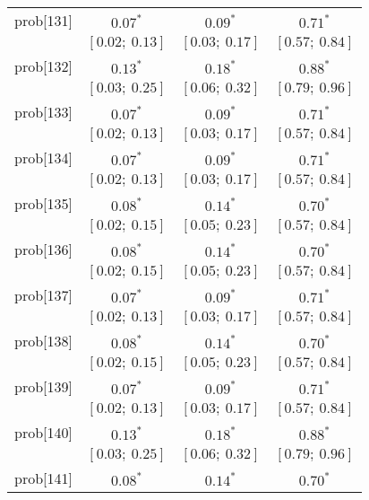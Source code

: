 \begin{table}
\begin{center}
\begin{tabular}{l c c c }
prob[131] & $0.07^{*}$              & $0.09^{*}$              & $0.71^{*}$            \\
          & $[0.02;\ 0.13]$         & $[0.03;\ 0.17]$         & $[0.57;\ 0.84]$       \\
prob[132] & $0.13^{*}$              & $0.18^{*}$              & $0.88^{*}$            \\
          & $[0.03;\ 0.25]$         & $[0.06;\ 0.32]$         & $[0.79;\ 0.96]$       \\
prob[133] & $0.07^{*}$              & $0.09^{*}$              & $0.71^{*}$            \\
          & $[0.02;\ 0.13]$         & $[0.03;\ 0.17]$         & $[0.57;\ 0.84]$       \\
prob[134] & $0.07^{*}$              & $0.09^{*}$              & $0.71^{*}$            \\
          & $[0.02;\ 0.13]$         & $[0.03;\ 0.17]$         & $[0.57;\ 0.84]$       \\
prob[135] & $0.08^{*}$              & $0.14^{*}$              & $0.70^{*}$            \\
          & $[0.02;\ 0.15]$         & $[0.05;\ 0.23]$         & $[0.57;\ 0.84]$       \\
prob[136] & $0.08^{*}$              & $0.14^{*}$              & $0.70^{*}$            \\
          & $[0.02;\ 0.15]$         & $[0.05;\ 0.23]$         & $[0.57;\ 0.84]$       \\
prob[137] & $0.07^{*}$              & $0.09^{*}$              & $0.71^{*}$            \\
          & $[0.02;\ 0.13]$         & $[0.03;\ 0.17]$         & $[0.57;\ 0.84]$       \\
prob[138] & $0.08^{*}$              & $0.14^{*}$              & $0.70^{*}$            \\
          & $[0.02;\ 0.15]$         & $[0.05;\ 0.23]$         & $[0.57;\ 0.84]$       \\
prob[139] & $0.07^{*}$              & $0.09^{*}$              & $0.71^{*}$            \\
          & $[0.02;\ 0.13]$         & $[0.03;\ 0.17]$         & $[0.57;\ 0.84]$       \\
prob[140] & $0.13^{*}$              & $0.18^{*}$              & $0.88^{*}$            \\
          & $[0.03;\ 0.25]$         & $[0.06;\ 0.32]$         & $[0.79;\ 0.96]$       \\
prob[141] & $0.08^{*}$              & $0.14^{*}$              & $0.70^{*}$            \\

\end{tabular}
\end{center}
\end{table}
